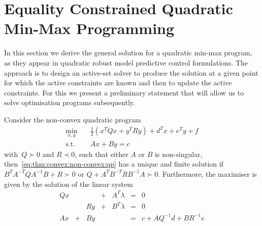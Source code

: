 \section{Equality Constrained Quadratic Min-Max Programming}\label{ch:MPC:sec:qMPC:equality:constraints}
%
%
\mysplit In this section we derive the general solution for a quadratic min-max program, as they appear in quadratic robust model predictive control formulations.
%
The approach is to design an active-set solver to produce the solution at a given point for which the active constraints are known and then to update the active constraints.
%
For this we present a preliminary statement that will allow us to solve optimisation programs subsequently.
%
\begin{thm}\label{thm:convex:non-convex:qp}
Consider the non-convex quadratic program
%
\begin{equation}\label{eq:thm:convex:non-convex:qp}\begin{aligned}
	\min_{x,y}&\quad\frac{1}{2}(x^TQx+y^TRy)+d^Tx+e^Ty+f\\
	\text{s.t.}&\quad Ax+By = c\end{aligned}
\end{equation}
%
with~$Q\succ0$ and $R\prec0$, such that either $A$ or $B$ is non-singular, then~\eqref{eq:thm:convex:non-convex:qp} has a unique and finite solution if $B^TA^{-T}QA^{-1}B+R\succ0$ or $Q+A^TB^{-T}RB^{-1}A\succ0$.
%
Furthermore, the maximiser is given by the solution of the linear system
%
\begin{equation}
	\begin{aligned} Qx &  & & +& A^T\lambda & = & 0\\
					 & &  Ry & + & B^T\lambda & = & 0\\
					 Ax & + & By & & & = & c+AQ^{-1}d+BR^{-1}e
	\end{aligned}
\end{equation}
\end{thm}
%
